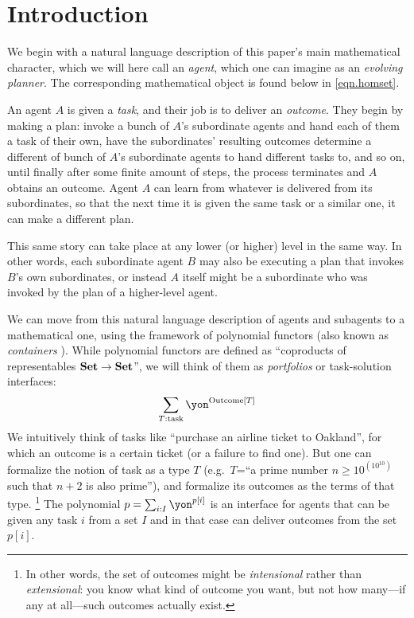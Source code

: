 \chapter{Introduction}\label{sec:intro}

We begin with a natural language description of this paper's main mathematical character, which we will here call an \emph{agent}, which one can imagine as an \emph{evolving planner}. The corresponding mathematical object is found below in \eqref{eqn.homset}.

An agent $A$ is given a \emph{task}, and their job is to deliver an \emph{outcome}. They begin by making a plan: invoke a bunch of $A$'s subordinate agents and hand each of them a task of their own, have the subordinates' resulting outcomes determine a different of bunch of $A$'s subordinate agents to hand different tasks to, and so on, until finally after some finite amount of steps, the process terminates and $A$ obtains an outcome. Agent $A$ can learn from whatever is delivered from its subordinates, so that the next time it is given the same task or a similar one, it can make a different plan. 

This same story can take place at any lower (or higher) level in the same way. In other words, each subordinate agent $B$ may also be executing a plan that invokes $B$'s own subordinates, or instead $A$ itself might be a subordinate who was invoked by the plan of a higher-level agent.

We can move from this natural language description of agents and subagents to a mathematical one, using the framework of polynomial functors (also known as \emph{containers} \cite{abbott2005containers,abbot2003categoriesthesis,ahman2014when}). While polynomial functors are defined as ``coproducts of representables $\mathbf{Set}\to\mathbf{Set}$'', we will think of them as \emph{portfolios} or task-solution interfaces:
\[
\sum_{T:\text{task}}\yon^{\text{Outcome}[T]}
\]
We intuitively think of tasks like ``purchase an airline ticket to Oakland'', for which an outcome is a certain ticket (or a failure to find one). But one can formalize the notion of task as a type $T$ (e.g.\ $T$=``a prime number $n\geq10^{(10^{10})}$ such that $n+2$ is also prime''), and formalize its outcomes as the terms of that type.%
\footnote{In other words, the set of outcomes might be \emph{intensional} rather than \emph{extensional}: you know what kind of outcome you want, but not how many---if any at all---such outcomes actually exist.} The polynomial $p=\sum_{i:I}\yon^{p[i]}$ is an interface for agents that can be given any task $i$ from a set $I$ and in that case can deliver outcomes from the set $p[i]$.

